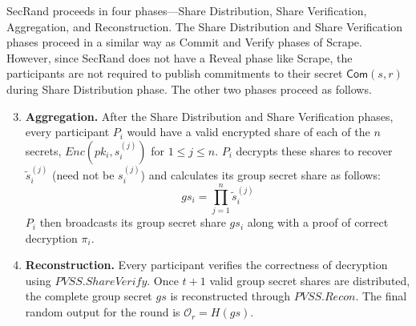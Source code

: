 \documentclass[letterpaper,twocolumn,10pt]{article}
\theoremstyle{definition}
\theoremstyle{remark}
\begin{document}
SecRand proceeds in four phases---Share Distribution, Share Verification, Aggregation, and Reconstruction. The Share Distribution and Share Verification phases proceed in a similar way as Commit and Verify phases of Scrape. However, since SecRand does not have a Reveal phase like Scrape, the participants are not required to publish commitments to their secret $\mathsf{Com}(s, r)$ during Share Distribution phase. The other two phases proceed as follows.
\begin{enumerate}
    \setcounter{enumi}{2}
    \item \textbf{Aggregation.} After the Share Distribution and Share Verification phases, every participant $P_i$ would have a valid encrypted share of each of the $n$ secrets, $Enc(pk_i, s_i^{(j)})$ for $1 \le j \le n$. $P_i$ decrypts these shares to recover $\tilde{s}_i^{(j)}$ (need not be $s_i^{(j)}$) and calculates its group secret share as follows: 
    $$ gs_i = \prod_{j=1}^{n}\tilde{s}_i^{(j)} $$
    $P_i$ then broadcasts its group secret share $gs_i$ along with a proof of correct decryption $\pi_i$.
    \item \textbf{Reconstruction.} Every participant verifies the correctness of decryption using $PVSS.ShareVerify$. Once $t+1$ valid group secret shares are distributed, the complete group secret $gs$ is reconstructed through $PVSS.Recon$. The final random output for the round is $\mathcal{O}_r = H(gs)$.
\end{enumerate}
\end{document}
